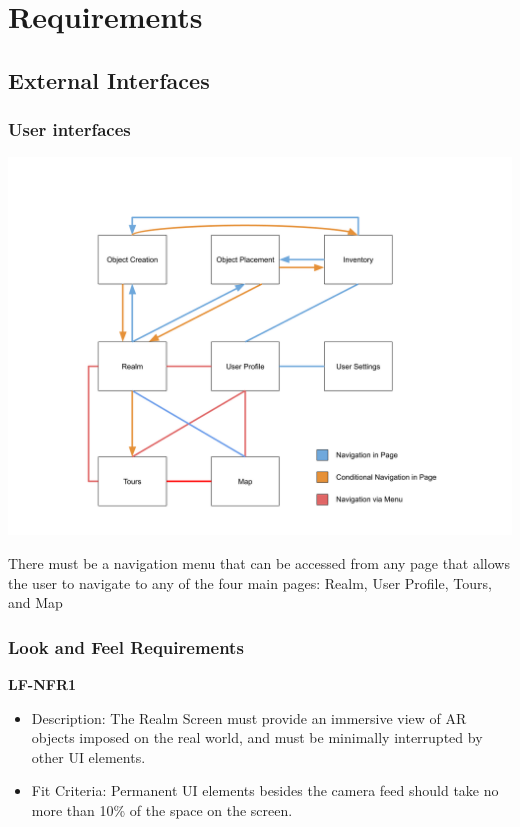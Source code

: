 \documentclass{article}
\begin{document}
\section{Requirements}


\subsection{External Interfaces}

\subsubsection{User interfaces}

\begin{center}
    \includegraphics[scale=0.4]{OtherDiagrams/ui_flow.png}
\end{center}

There must be a navigation menu that can be accessed from any page that allows the user to navigate to any of the four main pages: Realm, User Profile, Tours, and Map

\subsubsection{Look and Feel Requirements}

\textbf{LF-NFR1}

\begin{itemize}
    \item Description: The Realm Screen must provide an immersive view of AR objects imposed on the real world, and must be minimally interrupted by other UI elements.
    \item Fit Criteria: Permanent UI elements besides the camera feed should take no more than 10\% of the space on the screen.
\end{itemize}
\end{document}
